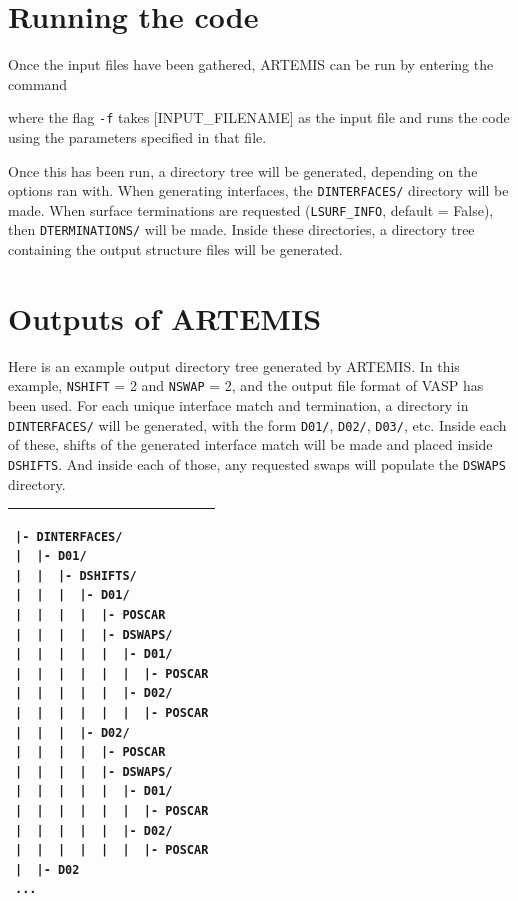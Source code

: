 \documentclass[12pt,a4paper,onecolumn,titlepage]{report}
\newcommand{\code}[2][]{\texttt{#2}}
\newcommand{\codeinline}[2][]{{\tt#2}}
\newcommand{\codeline}[2][]{\hspace{2em}{\tt#2}}
\newcommand{\artemis}{{ARTEMIS}}
\begin{document}
\section{Running the code}
\label{sec:run_code}

Once the input files have been gathered, \artemis{} can be run by entering the command

\codeline{artemis -f [INPUT\_FILENAME]}

\noindent
where the flag \codeinline{-f} takes [INPUT\_FILENAME] as the input file and runs the code using the parameters specified in that file.

Once this has been run, a directory tree will be generated, depending on the options ran with. When generating interfaces, the \codeinline{DINTERFACES/} directory will be made. When surface terminations are requested (\code{LSURF\_INFO}, default = False), then \codeinline{DTERMINATIONS/} will be made. Inside these directories, a directory tree containing the output structure files will be generated.




\section{Outputs of ARTEMIS}
\label{sec:outputs}

Here is an example output directory tree generated by \artemis{}. In this example, \code{NSHIFT} = 2 and \code{NSWAP} = 2, and the output file format of VASP has been used. For each unique interface match and termination, a directory in \code{DINTERFACES/} will be generated, with the form \code{D01/}, \code{D02/}, \code{D03/}, etc. Inside each of these, shifts of the generated interface match will be made and placed inside \code{DSHIFTS}. And inside each of those, any requested swaps will populate the \code{DSWAPS} directory.

\begin{tabular}{p{\linewidth}}
\hline
\vspace{-1em}
\begin{verbatim}
|- DINTERFACES/
|  |- D01/
|  |  |- DSHIFTS/
|  |  |  |- D01/
|  |  |  |  |- POSCAR
|  |  |  |  |- DSWAPS/
|  |  |  |  |  |- D01/
|  |  |  |  |  |  |- POSCAR
|  |  |  |  |  |- D02/
|  |  |  |  |  |  |- POSCAR
|  |  |  |- D02/
|  |  |  |  |- POSCAR
|  |  |  |  |- DSWAPS/
|  |  |  |  |  |- D01/
|  |  |  |  |  |  |- POSCAR
|  |  |  |  |  |- D02/
|  |  |  |  |  |  |- POSCAR
|  |- D02
...
\end{verbatim}
\tabularnewline [-2em]
\hline
\end{tabular}
\end{document}
